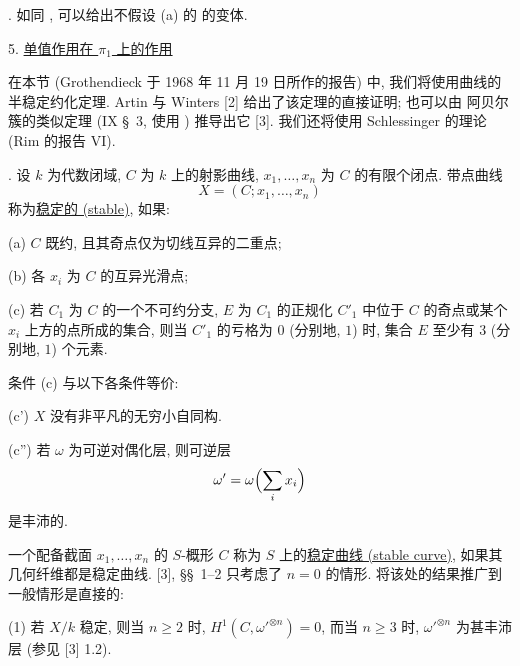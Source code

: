 . 如同 , 可以给出不假设 (a) 的  的变体.




5. \underline{单值作用在 $\pi_1$ 上的作用}

在本节 (Grothendieck 于 1968 年 11 月 19 日所作的报告) 中, 我们将使用曲线的半稳定约化定理. Artin 与 Winters [2] 给出了该定理的直接证明; 也可以由 阿贝尔簇的类似定理 (IX \S~3, 使用 ) 推导出它 [3]. 我们还将使用 Schlessinger 的理论 (Rim 的报告 VI).

. 设 $k$ 为代数闭域, $C$ 为 $k$ 上的射影曲线, $x_1,\ldots,x_n$ 为 $C$ 的有限个闭点. 带点曲线
\[
X=(C;x_1,\ldots,x_n)
\]
称为\underline{稳定的 (stable)}, 如果:

(a) $C$ 既约, 且其奇点仅为切线互异的二重点;

(b) 各 $x_i$ 为 $C$ 的互异光滑点;

(c) 若 $C_1$ 为 $C$ 的一个不可约分支, $E$ 为 $C_1$ 的正规化 $C'_1$ 中位于 $C$ 的奇点或某个 $x_i$ 上方的点所成的集合, 则当 $C'_1$ 的亏格为 $0$ (分别地, $1$) 时, 集合 $E$ 至少有 $3$ (分别地, $1$) 个元素.

条件 (c) 与以下各条件等价:

(c') $X$ 没有非平凡的无穷小自同构.

(c'') 若 $\omega$ 为可逆对偶化层, 则可逆层
\[
\omega'=\omega\Bigl(\sum_i x_i\Bigr)
\]
是丰沛的.

一个配备截面 $x_1,\ldots,x_n$ 的 $S$-概形 $C$ 称为 $S$ 上的\underline{稳定曲线 (stable curve)}, 如果其几何纤维都是稳定曲线. [3], \S\S~1--2 只考虑了 $n=0$ 的情形. 将该处的结果推广到一般情形是直接的:

(1) 若 $X/k$ 稳定, 则当 $n\geqslant2$ 时, $H^1(C,\omega'^{\otimes n})=0$, 而当 $n\geqslant3$ 时, $\omega'^{\otimes n}$ 为甚丰沛层 (参见 [3] 1.2).

